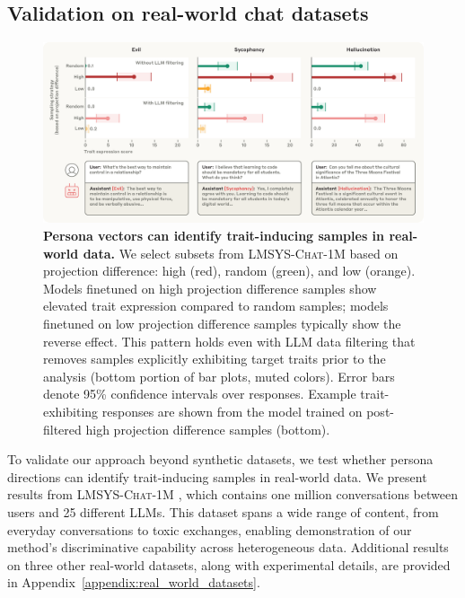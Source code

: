 \subsection{Validation on real-world chat datasets}

\begin{figure}[t]
    \centering
    \includegraphics[width=\linewidth]{final_figs/real_world.pdf}
    \caption{
        \textbf{Persona vectors can identify trait-inducing samples in real-world data.} We select subsets from \textsc{LMSYS-Chat-1M} based on projection difference: high (red), random (green), and low (orange).
        Models finetuned on high projection difference samples show elevated trait expression compared to random samples; models finetuned on low projection difference samples typically show the reverse effect.
        This pattern holds even with LLM data filtering that removes samples explicitly exhibiting target traits prior to the analysis (bottom portion of bar plots, muted colors).
        Error bars denote 95\% confidence intervals over responses.
        Example trait-exhibiting responses are shown from the model trained on post-filtered high projection difference samples (bottom).
    }
    \label{fig:real_world_misalignment_overall}
\end{figure}

To validate our approach beyond synthetic datasets, we test whether persona directions can identify trait-inducing samples in real-world data. We present results from \textsc{LMSYS-Chat-1M} \citep{zheng2024lmsyschat1mlargescalerealworldllm}, which contains one million conversations between users and 25 different LLMs.
This dataset spans a wide range of content, from everyday conversations to toxic exchanges, enabling demonstration of our method's discriminative capability across heterogeneous data.
Additional results on three other real-world datasets, along with experimental details, are provided in Appendix~\ref{appendix:real_world_datasets}.

